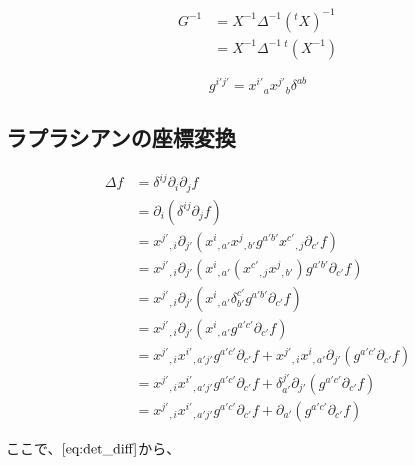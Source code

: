 \documentclass[a4paper,11pt]{article}
\begin{document}
\begin{align}
  G^{-1} & = X^{-1}\Delta^{-1}\left( {}^t\! X \right)^{-1} \nonumber \\
         & = X^{-1}\Delta^{-1}\,{}^t\! \left( X^{-1} \right)
\end{align}

\begin{equation}
  \boxed{
  g^{i'j'} = x^{i'}{}_{a}x^{j'}{}_{b}\delta^{ab}
  }
\end{equation}

\subsection{ラプラシアンの座標変換}%


\begin{align}
  \Delta f & = \delta^{ij} \partial_{i} \partial_{j} f \nonumber                                                                               \\
           & = \partial_{i} \left(\delta^{ij}\partial_{j}f\right) \nonumber                                                                    \\
           & = x^{j'}{}_{,i}\partial_{j'}\left(x^{i}{}_{,a'}x^{j}{}_{,b'}g^{a'b'}x^{c'}{}_{,j}\partial_{c'}f  \right) \nonumber                \\
           & = x^{j'}{}_{,i}\partial_{j'}\left(x^{i}{}_{,a'}(x^{c'}{}_{,j}x^{j}{}_{,b'})g^{a'b'}\partial_{c'}f  \right) \nonumber              \\
           & = x^{j'}{}_{,i}\partial_{j'}\left(x^{i}{}_{,a'}\delta^{c'}_{b'}g^{a'b'}\partial_{c'}f  \right) \nonumber                          \\
           & = x^{j'}{}_{,i}\partial_{j'}\left(x^{i}{}_{,a'}g^{a'c'}\partial_{c'}f  \right) \nonumber                                          \\
           & = x^{j'}{}_{,i}x^{i'}{}_{,a'j'}g^{a'c'}\partial_{c'}f + x^{j'}{}_{,i}x^{i}{}_{,a'}\partial_{j'}(g^{a'c'}\partial_{c'}f) \nonumber \\
           & = x^{j'}{}_{,i}x^{i'}{}_{,a'j'}g^{a'c'}\partial_{c'}f + \delta^{j'}_{a'}\partial_{j'}(g^{a'c'}\partial_{c'}f) \nonumber           \\
           & = x^{j'}{}_{,i}x^{i'}{}_{,a'j'}g^{a'c'}\partial_{c'}f + \partial_{a'}(g^{a'c'}\partial_{c'}f)
  \label{eq:laplace_beltrami_01}
\end{align}

\noindent
ここで、$\eqref{eq:det_diff}$から、
\end{document}
